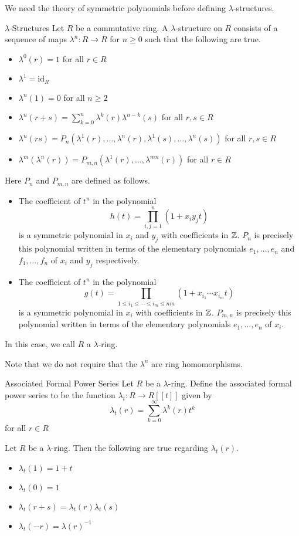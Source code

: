 \documentclass[a4paper]{article}
\begin{document}
We need the theory of symmetric polynomials before defining $\lambda$-structures. 

\begin{defn}{$\lambda$-Structures}{} Let $R$ be a commutative ring. A $\lambda$-structure on $R$ consists of a sequence of maps $\lambda^n:R\to R$ for $n\geq 0$ such that the following are true. 
\begin{itemize}
\item $\lambda^0(r)=1$ for all $r\in R$
\item $\lambda^1=\text{id}_R$
\item $\lambda^n(1)=0$ for all $n\geq 2$
\item $\lambda^n(r+s)=\sum_{k=0}^n\lambda^k(r)\lambda^{n-k}(s)$ for all $r,s\in R$
\item $\lambda^n(rs)=P_n(\lambda^1(r),\dots,\lambda^n(r),\lambda^1(s),\dots,\lambda^n(s))$ for all $r,s\in R$
\item $\lambda^m(\lambda^n(r))=P_{m,n}(\lambda^1(r),\dots,\lambda^{mn}(r))$ for all $r\in R$
\end{itemize}
Here $P_n$ and $P_{m,n}$ are defined as follows. 
\begin{itemize}
\item The coefficient of $t^n$ in the polynomial $$h(t)=\prod_{i,j=1}^n(1+x_iy_jt)$$ is a symmetric polynomial in $x_i$ and $y_j$ with coefficients in $\mathbb{Z}$. $P_n$ is precisely this polynomial written in terms of the elementary polynomials $e_1,\dots,e_n$ and $f_1,\dots,f_n$ of $x_i$ and $y_j$ respectively. 
\item The coefficient of $t^n$ in the polynomial $$g(t)=\prod_{1\leq i_1\leq\cdots\leq i_m\leq nm}(1+x_{i_1}\cdots x_{i_m}t)$$ is a symmetric polynomial in $x_i$ with coefficients in $\mathbb{Z}$. $P_{m,n}$ is precisely this polynomial written in terms of the elementary polynomials $e_1,\dots,e_n$ of $x_i$. 
\end{itemize}
In this case, we call $R$ a $\lambda$-ring. 
\end{defn}

Note that we do not require that the $\lambda^n$ are ring homomorphisms. 

\begin{defn}{Associated Formal Power Series}{} Let $R$ be a $\lambda$-ring. Define the associated formal power series to be the function $\lambda_t:R\to R[[t]]$ given by $$\lambda_t(r)=\sum_{k=0}^\infty\lambda^k(r)t^k$$ for all $r\in R$
\end{defn}

\begin{prp}{}{} Let $R$ be a $\lambda$-ring. Then the following are true regarding $\lambda_t(r)$. 
\begin{itemize}
\item $\lambda_t(1)=1+t$
\item $\lambda_t(0)=1$
\item $\lambda_t(r+s)=\lambda_t(r)\lambda_t(s)$
\item $\lambda_t(-r)=\lambda(r)^{-1}$
\end{itemize}
\end{prp}
\end{document}
